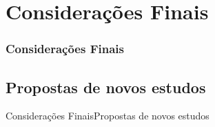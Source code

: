 \section{Considerações Finais}
\begin{frame}
\frametitle{Considerações Finais}
\label{consideracoes_finais}

\end{frame}


\subsection{Propostas de novos estudos}
\begin{frame}{Considerações Finais}{Propostas de novos estudos}

\end{frame}
